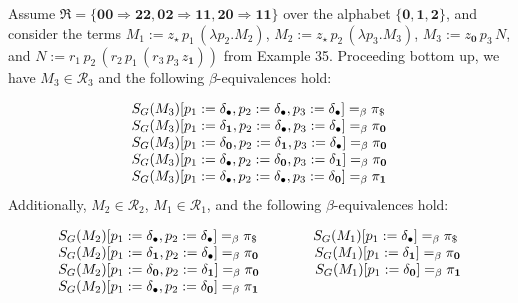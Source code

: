 \documentclass[10pt,a4paper]{amsart}
\begin{document}
Assume $\mathfrak{R}=\{\mathbf{0}\mathbf{0}\Rightarrow\mathbf{2}\mathbf{2},\mathbf{0}%
\mathbf{2}\Rightarrow\mathbf{1}\mathbf{1},\mathbf{2}\mathbf{0}\Rightarrow%
\mathbf{1}\mathbf{1}\}$ over the alphabet $\{\mathbf{0},\mathbf{1},\mathbf{2}\}$, and consider the terms $M_{1}:=z_{\star}\,p_{1}\,(\lambda p_{2}.M_{2})$, $M_{2}:=z_{\star}\,p_{2}\,(\lambda p_{3}.M_{3})$, $M_{3}:=z_{\mathbf{0}}\,p_{3}\,N$, and $N:=r_{1}\,p_{2}\,(r_{2}\,p_{1}\,(r_{3}\,p_{3}\,z_{\mathbf{1}}))$ from Example 35. Proceeding bottom up, we have $M_{3}\in\mathcal{R}_{3}$ and the following $\beta$-equivalences hold:\par
    \[\begin{array}[]{l}S_{G}(M_{3})[p_{1}:=\delta_{\bullet},p_{2}:=\delta_{\bullet}%
,p_{3}:=\delta_{\bullet}]=_{\beta}\pi_{\$}\\
S_{G}(M_{3})[p_{1}:=\delta_{\mathbf{1}},p_{2}:=\delta_{\bullet},p_{3}:=\delta_%
{\bullet}]=_{\beta}\pi_{\mathbf{0}}\\
S_{G}(M_{3})[p_{1}:=\delta_{\mathbf{0}},p_{2}:=\delta_{\mathbf{1}},p_{3}:=%
\delta_{\bullet}]=_{\beta}\pi_{\mathbf{0}}\\
S_{G}(M_{3})[p_{1}:=\delta_{\bullet},p_{2}:=\delta_{\mathbf{0}},p_{3}:=\delta_%
{\mathbf{1}}]=_{\beta}\pi_{\mathbf{0}}\\
S_{G}(M_{3})[p_{1}:=\delta_{\bullet},p_{2}:=\delta_{\bullet},p_{3}:=\delta_{%
\mathbf{0}}]=_{\beta}\pi_{\mathbf{1}}\end{array}\]    
Additionally, $M_{2}\in\mathcal{R}_{2}$, $M_{1}\in\mathcal{R}_{1}$, and the following $\beta$-equivalences hold:\par
    \[\begin{array}[]{l}S_{G}(M_{2})[p_{1}:=\delta_{\bullet},p_{2}:=\delta_{\bullet}%
]=_{\beta}\pi_{\$}\qquad\qquad S_{G}(M_{1})[p_{1}:=\delta_{\bullet}]=_{\beta}%
\pi_{\$}\\
S_{G}(M_{2})[p_{1}:=\delta_{\mathbf{1}},p_{2}:=\delta_{\bullet}]=_{\beta}\pi_{%
\mathbf{0}}\qquad\qquad S_{G}(M_{1})[p_{1}:=\delta_{\mathbf{1}}]=_{\beta}\pi_{%
\mathbf{0}}\\
S_{G}(M_{2})[p_{1}:=\delta_{\mathbf{0}},p_{2}:=\delta_{\mathbf{1}}]=_{\beta}%
\pi_{\mathbf{0}}\qquad\qquad S_{G}(M_{1})[p_{1}:=\delta_{\mathbf{0}}]=_{\beta}%
\pi_{\mathbf{1}}\\
S_{G}(M_{2})[p_{1}:=\delta_{\bullet},p_{2}:=\delta_{\mathbf{0}}]=_{\beta}\pi_{%
\mathbf{1}}\end{array}\]    
 
 
\end{document}
